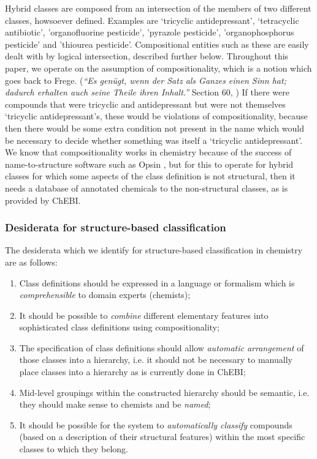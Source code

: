 \documentclass[10pt]{bmc_article}
\newenvironment{bmcformat}{\baselineskip20pt\sloppy\setboolean{publ}{false}}{\baselineskip20pt\sloppy}
\begin{document}
\begin{bmcformat}
Hybrid classes are composed from an intersection of the members of two different classes, howsoever defined.  Examples are `tricyclic antidepressant', `tetracyclic antibiotic', 'organofluorine pesticide', 'pyrazole pesticide', 'organophosphorus pesticide' and 'thiourea pesticide'. Compositional entities such as these are easily dealt with by logical intersection, described further below. 
Throughout this paper, we operate on the assumption of compositionality, which is a notion which goes back to Frege.  (\textit{``Es gen\"{u}gt, wenn der Satz als Ganzes einen Sinn hat; dadurch erhalten auch seine Theile ihren Inhalt.''} Section 60, \cite{Frege1884-FREGDA-3})
If there were compounds that were tricyclic and antidepressant but were not themselves `tricyclic antidepressant's, these would be violations of compositionality, because then there would be some extra condition not present in the name which would be necessary to decide whether something was itself a `tricyclic antidepressant'.
We know that compositionality works in chemistry because of the success of name-to-structure software such as Opsin \cite{lowe2011},
but for this to operate for hybrid classes for which some aspects of the class definition is not structural, then it needs a database of annotated chemicals to the non-structural classes, as is provided by ChEBI. 

\subsubsection*{Desiderata for structure-based classification}

The desiderata which we identify for structure-based classification in chemistry are as follows:
\begin{enumerate}
	\item Class definitions should be expressed in a language or formalism which is \textit{comprehensible} to domain experts (chemists);
  \item It should be possible to \textit{combine} different elementary features into sophisticated class definitions using compositionality;	
	\item The specification of class definitions should allow \textit{automatic arrangement} of those classes into a hierarchy, i.e. it should not be necessary to manually place classes into a hierarchy as is currently done in ChEBI;
	\item Mid-level groupings within the constructed hierarchy should be semantic, i.e. they should make sense to chemists and be \textit{named};
	\item It should be possible for the system to \textit{automatically classify} compounds (based on a description of their structural features) within the most specific classes to which they belong. 
\end{enumerate}



\end{bmcformat}
\end{document}
